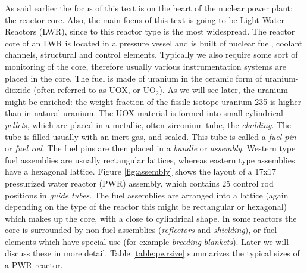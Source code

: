 As said earlier the focus of this text is on the heart of the nuclear power plant: the reactor core. Also, the main focus of this text is going to be Light Water Reactors (LWR), since to this reactor type is the most widespread. The reactor core of an LWR is located in a pressure vessel and is built of nuclear fuel, coolant channels, structural and control elements. Typically we also require some sort of monitoring of the core, therefore usually various instrumentation systems are placed in the core. The fuel is made of uranium in the ceramic form of uranium-dioxide (often referred to as UOX, or UO$_2$). As we will see later, the uranium might be enriched: the weight fraction of the fissile isotope uranium-235 is higher than in natural uranium. The UOX material is formed into small cylindrical \textit{pellet}s, which are placed in a metallic, often zirconium tube, the \textit{cladding}. The tube is filled usually with an inert gas, and sealed. This tube is called a \textit{fuel pin} or \textit{fuel rod}. The fuel pins are then placed in a \textit{bundle} or \textit{assembly}. Western type fuel assemblies are usually rectangular lattices, whereas eastern type assemblies have a hexagonal lattice. Figure \ref{fig:assembly} shows the layout of a 17x17 pressurized water reactor (PWR) assembly, which contains 25 control rod positions in \textit{guide tubes}. The fuel assemblies are arranged into a lattice (again depending on the type of the reactor this might be rectangular or hexagonal) which makes up the core, with a close to cylindrical shape. In some reactors the core is surrounded by non-fuel assemblies (\textit{reflectors} and \textit{shielding}), or fuel elements which have special use (for example \textit{breeding blankets}). Later we will discuss these in more detail. Table \ref{table:pwrsize} summarizes the typical sizes of a PWR reactor. 

